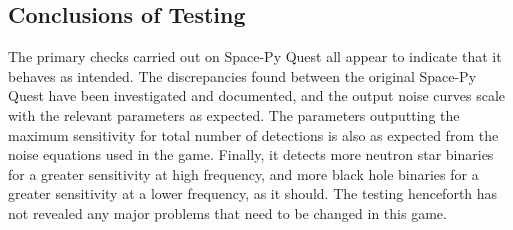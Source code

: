 \documentclass{article}
\begin{document}
\subsection{Conclusions of Testing}
 The primary checks carried out on Space-Py Quest all appear to indicate that it behaves as intended. The discrepancies found between the original Space-Py Quest have been investigated and documented, and the output noise curves scale with the relevant parameters as expected. The parameters outputting the maximum sensitivity for total number of detections is also as expected from the noise equations used in the game. Finally, it detects more neutron star binaries for a greater sensitivity at high frequency, and more black hole binaries for a greater sensitivity at a lower frequency, as it should. The testing henceforth has not revealed any major problems that need to be changed in this game. 
 
\end{document}
